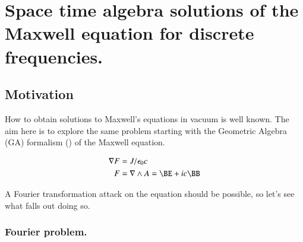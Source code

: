
%
%

\chapter{Space time algebra solutions of the Maxwell equation for discrete frequencies.}
\label{chap:maxwellVacuum}
\date{July 2, 2009}

\beginArtWithToc

\section{Motivation}

How to obtain solutions to Maxwell's equations in vacuum is well known.  The aim here is to explore the same problem starting with the Geometric Algebra (GA) formalism (\cite{doran2003gap}) of the Maxwell equation.

\begin{align}\label{eqn:maxwell}
\grad F &= J/\epsilon_0 c \\
F &= \grad \wedge A = \BE + i c \BB
\end{align}

A Fourier transformation attack on the equation should be possible, so let's see what falls out doing so.

\subsection{Fourier problem.}

